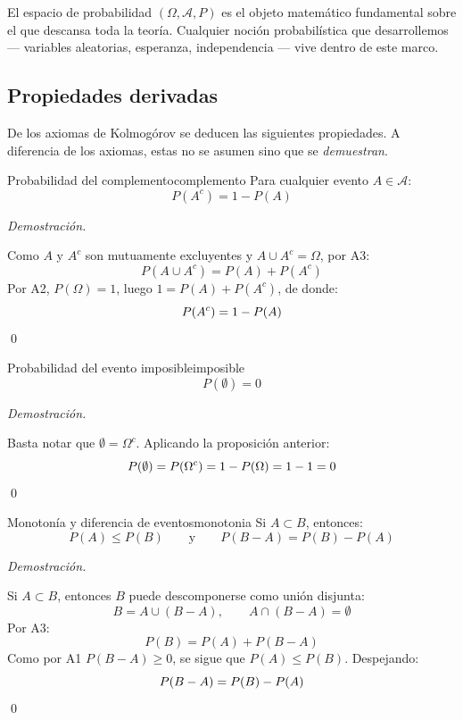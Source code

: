 \documentclass[12pt, a4paper]{book}
\renewenvironment{proof}{%
    \par\medskip\noindent\textit{Demostraci\'{o}n.}\enspace
}{\qed\par\medskip}
\numberwithin{equation}{chapter}
\begin{document}
El espacio de probabilidad $(\Omega, \mathcal{A}, P)$ es el objeto 
matemático fundamental sobre el que descansa toda la teoría. Cualquier 
noción probabilística que desarrollemos — variables aleatorias, 
esperanza, independencia — vive dentro de este marco.

\subsection{Propiedades derivadas}

De los axiomas de Kolmogórov se deducen las siguientes propiedades. 
A diferencia de los axiomas, estas no se asumen sino que se 
\textit{demuestran}.

\begin{proposicion}{Probabilidad del complemento}{complemento}
	Para cualquier evento $A \in \mathcal{A}$:
	\[
	P(A^c) = 1 - P(A)
	\]
\end{proposicion}

\begin{proof}
	Como $A$ y $A^c$ son mutuamente excluyentes y $A \cup A^c = \Omega$, 
	por A3:
	\[
	P(A \cup A^c) = P(A) + P(A^c)
	\]
	Por A2, $P(\Omega) = 1$, luego $1 = P(A) + P(A^c)$, de donde:
	\[
	P(A^c) = 1 - P(A) \qedhere
	\]
\end{proof}

\begin{proposicion}{Probabilidad del evento imposible}{imposible}
	\[
	P(\emptyset) = 0
	\]
\end{proposicion}

\begin{proof}
	Basta notar que $\emptyset = \Omega^c$. Aplicando la proposición 
	anterior:
	\[
	P(\emptyset) = P(\Omega^c) = 1 - P(\Omega) = 1 - 1 = 0 \qedhere
	\]
\end{proof}

\begin{proposicion}{Monotonía y diferencia de eventos}{monotonia}
	Si $A \subset B$, entonces:
	\[
	P(A) \leq P(B) \qquad \text{y} \qquad P(B - A) = P(B) - P(A)
	\]
\end{proposicion}

\begin{proof}
	Si $A \subset B$, entonces $B$ puede descomponerse como unión 
	disjunta:
	\[
	B = A \cup (B - A), \qquad A \cap (B-A) = \emptyset
	\]
	Por A3:
	\[
	P(B) = P(A) + P(B - A)
	\]
	Como por A1 $P(B - A) \geq 0$, se sigue que $P(A) \leq P(B)$. 
	Despejando:
	\[
	P(B - A) = P(B) - P(A) \qedhere
	\]
\end{proof}
\end{document}
